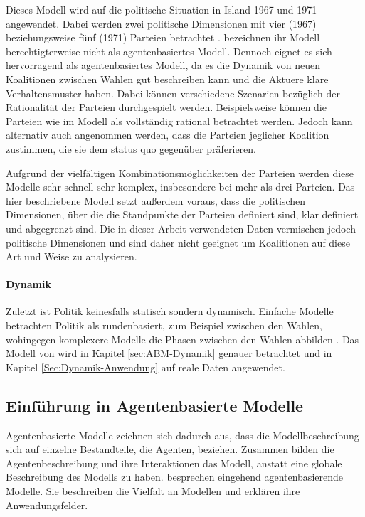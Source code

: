 Dieses Modell wird auf die politische Situation in Island 1967 und 1971 angewendet. Dabei werden zwei politische Dimensionen mit vier (1967) beziehungsweise fünf (1971) Parteien betrachtet \citep[S.\,882-885]{laver1990coalitions}. \citet{laver1990coalitions} bezeichnen ihr Modell berechtigterweise nicht als agentenbasiertes Modell. Dennoch eignet es sich hervorragend als agentenbasiertes Modell, da es die Dynamik von neuen Koalitionen zwischen Wahlen gut beschreiben kann und die Aktuere klare Verhaltensmuster haben. Dabei können verschiedene Szenarien bezüglich der Rationalität der Parteien durchgespielt werden. Beispielsweise können die Parteien wie im Modell als vollständig rational betrachtet werden. Jedoch kann alternativ auch angenommen werden, dass die Parteien jeglicher Koalition zustimmen, die sie dem status quo gegenüber präferieren.

Aufgrund der vielfältigen Kombinationsmöglichkeiten der Parteien werden diese Modelle sehr schnell sehr komplex, insbesondere bei mehr als drei Parteien. Das hier beschriebene Modell setzt außerdem voraus, dass die politischen Dimensionen, über die die Standpunkte der Parteien definiert sind, klar definiert und abgegrenzt sind. Die in dieser Arbeit verwendeten Daten vermischen jedoch politische Dimensionen und sind daher nicht geeignet um Koalitionen auf diese Art und Weise zu analysieren.

\paragraph{Dynamik}
Zuletzt ist Politik keinesfalls statisch sondern dynamisch. Einfache Modelle betrachten Politik als rundenbasiert, zum Beispiel zwischen den Wahlen, wohingegen komplexere Modelle die Phasen zwischen den Wahlen abbilden \citep[S.\,263-264]{laver2005policy}.
Das Modell von \citet{laver2005policy} wird in Kapitel \ref{sec:ABM-Dynamik} genauer betrachtet und in Kapitel \ref{Sec:Dynamik-Anwendung} auf reale Daten angewendet.

\subsection{Einführung in Agentenbasierte Modelle}

Agentenbasierte Modelle zeichnen sich dadurch aus, dass die Modellbeschreibung sich auf einzelne Bestandteile, die Agenten, beziehen. Zusammen bilden die Agentenbeschreibung und ihre Interaktionen das Modell, anstatt eine globale Beschreibung des Modells zu haben. \citet{marchi2014ABMs} besprechen eingehend agentenbasierende Modelle. Sie beschreiben die Vielfalt an Modellen und erklären ihre Anwendungsfelder.

